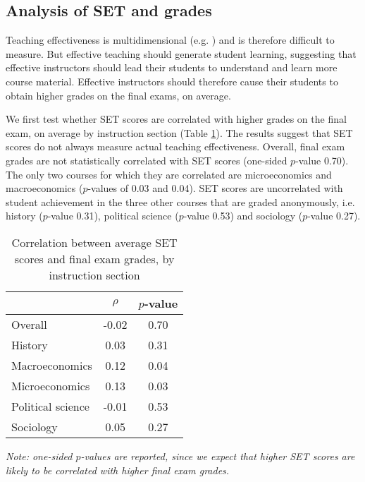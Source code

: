 \documentclass[12pt]{article}
\begin{document}
\subsection{Analysis of SET and grades}

Teaching effectiveness is multidimensional (e.g. \citet{Marsh1997}) and is therefore difficult to measure. But effective teaching should generate student learning, suggesting that effective instructors should lead their students to understand and learn more course material. Effective instructors should therefore cause their students to obtain higher grades on the final exams, on average. 

We first test whether SET scores are correlated with higher grades on the final exam, on average by instruction section (Table \ref{tab:finalexam}). The results suggest that SET scores do not always measure actual teaching effectiveness. Overall, final exam grades are not statistically correlated with SET scores (one-sided $p$-value 0.70). The only two courses for which they are correlated are microeconomics and macroeconomics ($p$-values of 0.03 and 0.04). SET scores are uncorrelated with student achievement in the three other courses that are graded anonymously, i.e. history ($p$-value 0.31), political science ($p$-value 0.53) and sociology ($p$-value 0.27). 

\begin{table}[htbp]
  \centering
  \footnotesize 
  \caption{Correlation between average SET scores and final exam grades, by instruction section}
    \begin{tabular}{lcc}
    \toprule 
                        & $\rho$  & $p$-value  \\
   \midrule
    Overall &            -0.02 &       0.70  \\
    History &             0.03 &       0.31  \\
    Macroeconomics &      0.12 &       0.04  \\
    Microeconomics &      0.13 &       0.03  \\
    Political science &  -0.01 &       0.53  \\
    Sociology &           0.05 &       0.27  \\
    \bottomrule
    \end{tabular}%
 \label{tab:finalexam}%
 
  \textit{Note: one-sided $p$-values are reported, since we expect that higher SET scores are likely to be correlated with higher final exam grades.}
\end{table}%
\normalsize
\end{document}
